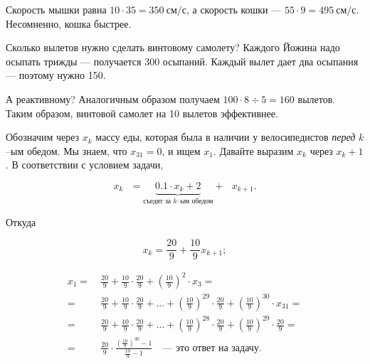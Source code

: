 ﻿
\begin{itemize}
\itA Скорость мышки равна $10 \cdot 35 = \SI{350}{\text{см}/\text{с}}$, а скорость кошки — $55 \cdot 9 = \SI{495}{\text{см}/\text{с}}$. Несомненно, кошка быстрее.

\itB Сколько вылетов нужно сделать винтовому самолету? Каждого Йожина надо осыпать трижды — получается 300 осыпаний. Каждый вылет дает два осыпания — поэтому нужно 150.

\ms А реактивному? Аналогичным образом получаем $100 \cdot 8 \div 5 = 160$ вылетов. Таким образом, винтовой самолет на 10 вылетов эффективнее.

\itC Обозначим через $x_k$ массу еды, которая была в наличии у велосипедистов {\itshape перед} $k$--ым обедом. Мы знаем, что $x_{31}=0$, и ищем $x_1$. Давайте выразим $x_k$ через $x_k+1$. В соответствии с условием задачи,

$$x_k\ \ \ = \underbrace{0.1 \cdot x_k + 2}_{\text{съедят за $k$--ым обедом}} +\ \ \ x_{k+1}.$$

Откуда

$$x_k = \frac{20}{9} + \frac{10}{9} x_{k+1};$$

\begin{align*}
x_1 =\ & \frac{20}{9} + \frac{10}{9} \cdot \frac{20}{9} + \left(\frac{10}{9}\right)^2 \cdot x_3 = \\
=\ & \frac{20}{9} + \frac{10}{9} \cdot \frac{20}{9} + \ldots + \left(\frac{10}{9}\right)^{29}
	\cdot\frac{20}{9} + \left(\frac{10}{9}\right)^{30} \cdot x_{31} = \\
=\ & \frac{20}{9} + \frac{10}{9} \cdot \frac{20}{9} + \ldots + \left(\frac{10}{9}\right)^{28}
	\cdot\frac{20}{9} + \left(\frac{10}{9}\right)^{29} \cdot \frac{20}{9} = \\
=\ & \frac{20}{9} \cdot \frac{\left(\tfrac{10}{9}\right)^{30}-1}{\tfrac{10}{9}-1}
	\quad \text{— это ответ на задачу.}
\end{align*}

\end{itemize}